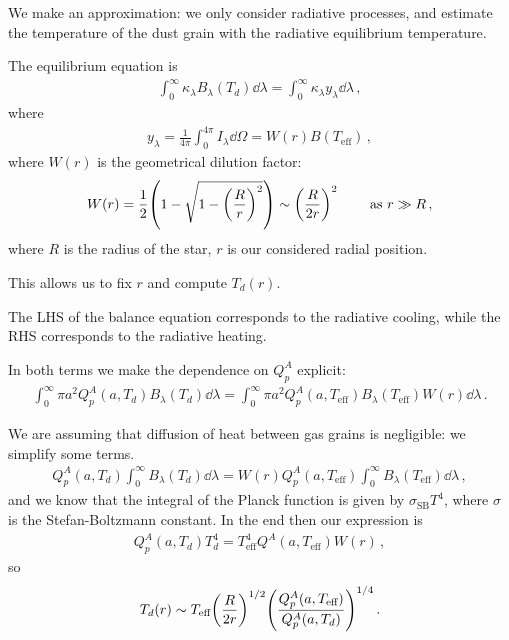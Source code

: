 \documentclass[main.tex]{subfiles}
\begin{document}
We make an approximation: we only consider radiative processes, and estimate the temperature of the dust grain with the radiative equilibrium temperature. 

The equilibrium equation is 
%
\begin{align}
  \int_{0}^{ \infty } \kappa_{\lambda } B_{\lambda }(T_d) \dd{\lambda }
  = \int_{0}^{ \infty } \kappa_{\lambda } y_{\lambda } \dd{\lambda }
\,,
\end{align}
%
where 
%
\begin{align}
  y_{\lambda } = \frac{1}{4 \pi } \int_{0}^{4 \pi } I_{\lambda } \dd{\Omega } = W(r) B( T _{\text{eff}})
\,,
\end{align}
%
where \(W(r)\) is the geometrical dilution factor: 
%
\begin{align}
  W(r ) = \frac{1}{2} \qty(1 - \sqrt{1 - \qty(\frac{R}{r})^2}) \sim \qty(\frac{R}{2r})^2
\qquad \text{ as } r \gg R
\,,
\end{align}
%
where \(R\) is the radius of the star, \(r\) is our considered radial position.

This allows us to fix \(r\) and compute \(T_d (r)\). 

The LHS of the balance equation corresponds to the radiative cooling, while the RHS corresponds to the radiative heating. 

In both terms we make the dependence on \(Q_p^{A}\) explicit: 
%
\begin{align}
  \int_{0}^{ \infty } \pi a^2 Q_p^{A} (a, T_d) B_\lambda (T_d) \dd{\lambda } =
  \int_{0}^{ \infty } \pi a^2 Q_p^{A} (a, T _{\text{eff}}) B_\lambda (T _{\text{eff}}) W(r) \dd{\lambda }
\,.
\end{align}

We are assuming that diffusion of heat between gas grains is negligible: we simplify some terms. 
%
\begin{align}
  Q_p^{A} (a, T_d ) \int_{0}^{ \infty } B_\lambda(T_d) \dd{\lambda }
  = W(r) Q_p^{A} (a, T _{\text{eff}}) \int_{0}^{ \infty }
  B_\lambda (T _{\text{eff}}) \dd{\lambda }
\,,
\end{align}
%
and we know that the integral of the Planck function is given by \(\sigma _{\text{SB}} T^{4}\), where \(\sigma \) is the Stefan-Boltzmann constant. In the end then our expression is 
%
\begin{align}
  Q_p^{A} (a, T_d) T_d^{4} = T^{4} _{\text{eff}} Q^{A}(a, T _{\text{eff}}) W(r)
\,,
\end{align}
%
so 
%
\begin{align}
  T_d(r) \sim T _{\text{eff}} \qty(\frac{R}{2r})^{1/2} \qty(\frac{Q^{A}_{p} (a, T _{\text{eff}})}{Q^{A}_{p} (a,T_{d})})^{1/4}
\,.
\end{align}
\end{document}
